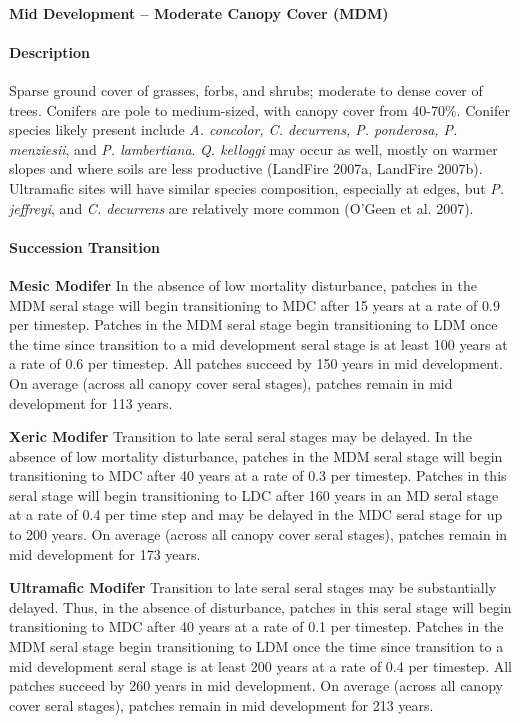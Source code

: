 \noindent\hrulefill

\paragraph{Mid Development – Moderate Canopy Cover (MDM)}

\paragraph{Description} Sparse ground cover of grasses, forbs, and shrubs; moderate to dense cover of trees. Conifers are pole to medium-sized, with canopy cover from 40-70\%. Conifer species likely present include \emph{A. concolor, C. decurrens, P. ponderosa, P. menziesii}, and \emph{P. lambertiana}. \emph{Q. kelloggi} may occur as well, mostly on warmer slopes and where soils are less productive (LandFire 2007a, LandFire 2007b). Ultramafic sites will have similar species composition, especially at edges, but \emph{P. jeffreyi}, and \emph{C. decurrens} are relatively more common (O’Geen et al. 2007).

\paragraph{Succession Transition}
\begin{adjustwidth}{2cm}{}
\textbf{Mesic Modifer } In the absence of low mortality disturbance, patches in the MDM seral stage will begin transitioning to MDC after 15 years at a rate of 0.9 per timestep. Patches in the MDM seral stage begin transitioning to LDM once the time since transition to a mid development seral stage is at least 100 years at a rate of 0.6 per timestep. All patches succeed by 150 years in mid development. On average (across all canopy cover seral stages), patches remain in mid development for 113 years.

\textbf{Xeric Modifer}  Transition to late seral seral stages may be delayed. In the absence of low mortality disturbance, patches in the MDM seral stage will begin transitioning to MDC after 40 years at a rate of 0.3 per timestep. Patches in this seral stage will begin transitioning to LDC after 160 years in an MD seral stage at a rate of 0.4 per time step and may be delayed in the MDC seral stage for up to 200 years. On average (across all canopy cover seral stages), patches remain in mid development for 173 years. 

\textbf{Ultramafic Modifer} Transition to late seral seral stages may be substantially delayed. Thus, in the absence of disturbance, patches in this seral stage will begin transitioning to MDC after 40 years at a rate of 0.1 per timestep. Patches in the MDM seral stage begin transitioning to LDM once the time since transition to a mid development seral stage is at least 200 years at a rate of 0.4 per timestep. All patches succeed by 260 years in mid development. On average (across all canopy cover seral stages), patches remain in mid development for 213 years.

\end{adjustwidth}

